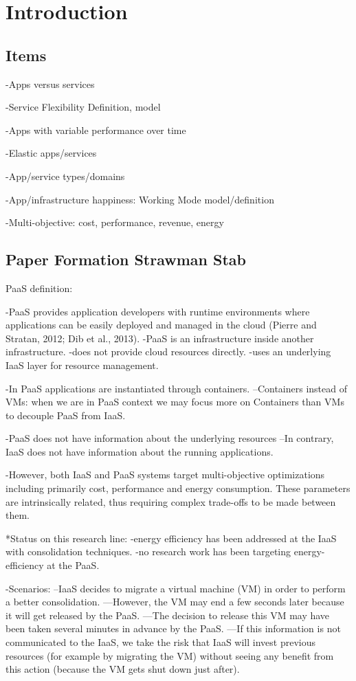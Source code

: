 \section{Introduction}
\label{sec: intro}

\subsection{Items}
-Apps versus services

-Service Flexibility Definition, model

-Apps with variable performance over time

-Elastic apps/services

-App/service types/domains

-App/infrastructure happiness: Working Mode model/definition

-Multi-objective: cost, performance, revenue, energy

\subsection{Paper Formation Strawman Stab}
PaaS definition:

-PaaS provides application developers with runtime environments where applications can be easily deployed and managed in the cloud (Pierre and Stratan, 2012; Dib et al., 2013).
-PaaS is an infrastructure inside another infrastructure.
-does not provide cloud resources directly.
-uses an underlying IaaS layer for resource management.

-In PaaS applications are instantiated through containers.
--Containers instead of VMs: when we are in PaaS context we may focus more on Containers than VMs to decouple PaaS from IaaS.

-PaaS does not have information about the underlying resources
--In contrary, IaaS does not have information about the running applications.

-However, both IaaS and PaaS systems target multi-objective optimizations including primarily cost, performance and energy consumption. These parameters are intrinsically related, thus requiring complex trade-offs to be made between them.

*Status on this research line:
-energy efficiency has been addressed at the IaaS with consolidation techniques.
-no research work has been targeting energy-efficiency at the PaaS.

-Scenarios: 
--IaaS decides to migrate a virtual machine (VM) in order to perform a better consolidation.
---However, the VM may end a few seconds later because it will get released by the PaaS.
---The decision to release this VM may have been taken several minutes in advance by the PaaS.
---If this information is not communicated to the IaaS, we take the risk that IaaS will invest previous resources (for example by migrating the VM) without seeing any benefit from this action (because the VM gets shut down just after).

